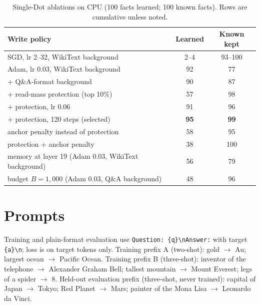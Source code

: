 \documentclass[11pt]{article}
\begin{document}
\begin{table}[h]
\centering
\small
\caption{Single-Dot ablations on CPU (100 facts learned; 100 known facts). Rows are cumulative unless noted.}
\label{tab:ablation}
\begin{tabular}{lcc}
\toprule
Write policy & Learned & Known kept \\
\midrule
SGD, lr 2--32, WikiText background & 2--4 & 93--100 \\
Adam, lr 0.03, WikiText background & 92 & 77 \\
\quad + Q\&A-format background & 90 & 87 \\
\quad + read-mass protection (top 10\%) & 57 & 98 \\
\quad + protection, lr 0.06 & 91 & 96 \\
\quad + protection, 120 steps (selected) & \textbf{95} & \textbf{99} \\
\midrule
anchor penalty instead of protection & 58 & 95 \\
protection + anchor penalty & 38 & 100 \\
memory at layer 19 (Adam 0.03, WikiText background) & 56 & 79 \\
budget $B=1{,}000$ (Adam 0.03, Q\&A background) & 48 & 96 \\
\bottomrule
\end{tabular}
\end{table}


\section{Prompts}
\label{app:prompts}
Training and plain-format evaluation use \texttt{Question: \{q\}\textbackslash nAnswer:} with target \texttt{ \{a\}\textbackslash n}; loss is on target tokens only.
Training prefix A (two-shot): gold $\rightarrow$ Au; largest ocean $\rightarrow$ Pacific Ocean.
Training prefix B (three-shot): inventor of the telephone $\rightarrow$ Alexander Graham Bell; tallest mountain $\rightarrow$ Mount Everest; legs of a spider $\rightarrow$ 8.
Held-out evaluation prefix (three-shot, never trained): capital of Japan $\rightarrow$ Tokyo; Red Planet $\rightarrow$ Mars; painter of the Mona Lisa $\rightarrow$ Leonardo da Vinci.
\end{document}
